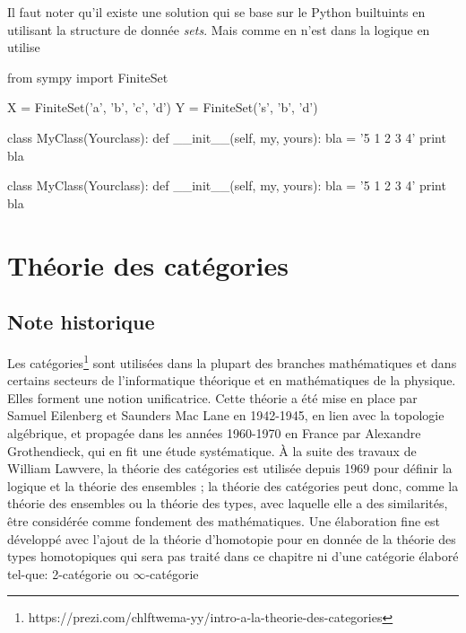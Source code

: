 \begin{solution}
Il faut noter qu'il existe une solution qui se base sur le Python builtuints en utilisant la structure de donnée \textit{sets}. Mais comme en n'est dans la logique en utilise 
\begin{python}
from sympy import FiniteSet

X = FiniteSet('a', 'b', 'c', 'd')
Y = FiniteSet('s', 'b', 'd')

class MyClass(Yourclass):
    def __init__(self, my, yours):
        bla = '5 1 2 3 4'
        print bla
\end{python}
\begin{python}
class MyClass(Yourclass):
    def __init__(self, my, yours):
        bla = '5 1 2 3 4'
        print bla
\end{python}

\end{solution}
\chapter{Théorie des catégories}
\section{Note historique}
Les catégories\footnote{https://prezi.com/chlftwema-yy/intro-a-la-theorie-des-categories} sont utilisées dans la plupart des branches mathématiques et dans certains secteurs de l'informatique théorique et en mathématiques de la physique. Elles forment une notion unificatrice. Cette théorie a été mise en place par Samuel Eilenberg et Saunders Mac Lane en 1942-1945, en lien avec la topologie algébrique, et propagée dans les années 1960-1970 en France par Alexandre Grothendieck, qui en fit une étude systématique. À la suite des travaux de William Lawvere, la théorie des catégories est utilisée depuis 1969 pour définir la logique et la théorie des ensembles ; la théorie des catégories peut donc, comme la théorie des ensembles ou la théorie des types, avec laquelle elle a des similarités, être considérée comme fondement des mathématiques. Une élaboration fine est développé avec l'ajout de la théorie d'homotopie pour en donnée de la théorie des types homotopiques qui sera pas traité dans ce chapitre  ni d'une catégorie élaboré tel-que: 2-catégorie ou $\infty$-catégorie
